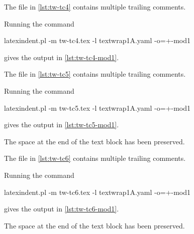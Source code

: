  \begin{example}
 The file in \cref{lst:tw-tc4} contains multiple trailing comments.

 Running the command
 \begin{commandshell}
latexindent.pl -m tw-tc4.tex -l textwrap1A.yaml -o=+-mod1 
\end{commandshell}
 gives the output in \cref{lst:tw-tc4-mod1}.
 \begin{cmhtcbraster}[raster column skip=.1\linewidth]
 \end{cmhtcbraster}
 \end{example}

 \begin{example}
 The file in \cref{lst:tw-tc5} contains multiple trailing comments.

 Running the command
 \begin{commandshell}
latexindent.pl -m tw-tc5.tex -l textwrap1A.yaml -o=+-mod1 
\end{commandshell}
 gives the output in \cref{lst:tw-tc5-mod1}.
 \begin{cmhtcbraster}[raster column skip=.1\linewidth]
 \end{cmhtcbraster}
 The space at the end of the text block has been preserved.
 \end{example}

 \begin{example}
 The file in \cref{lst:tw-tc6} contains multiple trailing comments.

 Running the command
 \begin{commandshell}
latexindent.pl -m tw-tc6.tex -l textwrap1A.yaml -o=+-mod1 
\end{commandshell}
 gives the output in \cref{lst:tw-tc6-mod1}.
 \begin{cmhtcbraster}[raster column skip=.1\linewidth]
 \end{cmhtcbraster}
 The space at the end of the text block has been preserved.
 \end{example}

